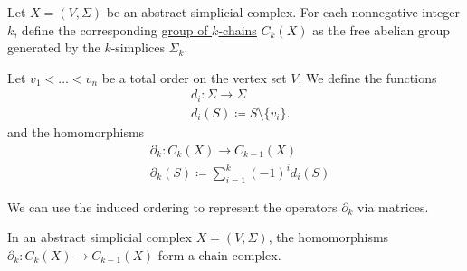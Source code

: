 \begin{definition}\label{def:group_of_chains}\cite[262]{Carlsson2009}
  Let $X = (V, \Sigma)$ be an abstract simplicial complex. For each nonnegative integer $k$, define the corresponding \uline{group of $k$-chains} $C_k(X)$ as the free abelian group generated by the $k$-simplices $\Sigma_k$.

  Let $v_1 < \ldots < v_n$ be a total order on the vertex set $V$. We define the functions
  \begin{align*}
    &d_i: \Sigma \to \Sigma \\
    &d_i(S) \coloneqq S \setminus \{ v_i \}.
  \end{align*}
  and the homomorphisms
  \begin{align*}
    &\partial_k: C_k(X) \to C_{k-1}(X) \\
    &\partial_k(S) \coloneqq \sum_{i=1}^k (-1)^i d_i(S)
  \end{align*}

  We can use the induced ordering to represent the operators $\partial_k$ via matrices.
\end{definition}

\begin{proposition}\label{def:abstract_simplicial_chain_complex}
  In an abstract simplicial complex $X = (V, \Sigma)$, the homomorphisms $\partial_k: C_k(X) \to C_{k-1}(X)$ form a chain complex.
\end{proposition}
